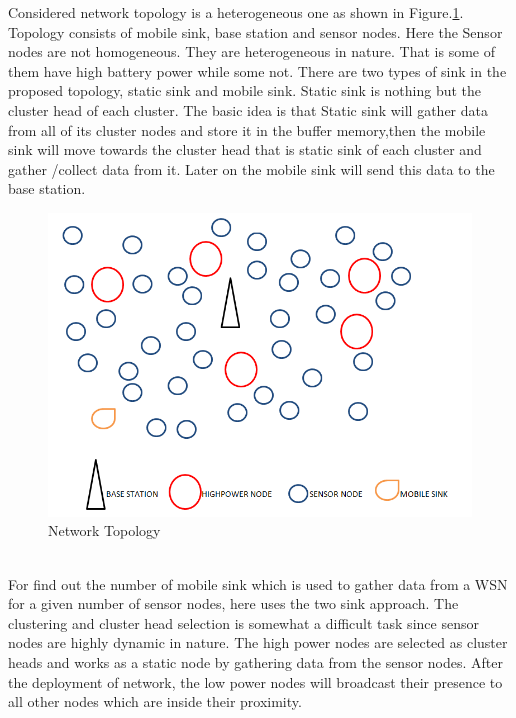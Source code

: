 \documentclass[MTech]{iitmdiss}
\begin{document}
	Considered network topology is a heterogeneous one as shown in Figure.\ref{f3}. Topology consists of mobile sink, base station and sensor nodes. Here the Sensor nodes are not homogeneous. They are heterogeneous in nature. That is some of them have high battery power while some not. There are two types of sink in the proposed topology, static sink and mobile sink. Static sink is nothing but the cluster head of each cluster. The basic idea is that Static sink will gather data from all of its cluster nodes and store it in the buffer memory,then the mobile sink will move towards the cluster head that is static sink of each cluster and gather /collect data from it. Later on the mobile sink will send this data to the base station.\\
\begin{figure}[ht!]
\centering
\includegraphics[scale=.75]{networktopology.PNG}
\caption{Network Topology\label{overflow}}
\label{f3}
\end{figure}\\
  For find out the number of mobile sink which is used to gather data from  a WSN for a given number of sensor nodes, here uses the two sink approach. The clustering and cluster head selection is somewhat a difficult task since sensor nodes are highly dynamic in nature. The high power nodes are selected as cluster heads and works as a static node by gathering data from the sensor nodes. After the deployment of network, the low power nodes will broadcast their presence to all other nodes which are inside their proximity.
\end{document}
